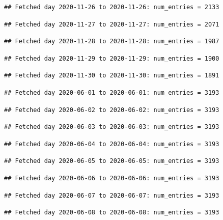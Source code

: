 \documentclass[]{article}
\begin{document}
\begin{verbatim}
## Fetched day 2020-11-26 to 2020-11-26: num_entries = 2133
\end{verbatim}

\begin{verbatim}
## Fetched day 2020-11-27 to 2020-11-27: num_entries = 2071
\end{verbatim}

\begin{verbatim}
## Fetched day 2020-11-28 to 2020-11-28: num_entries = 1987
\end{verbatim}

\begin{verbatim}
## Fetched day 2020-11-29 to 2020-11-29: num_entries = 1900
\end{verbatim}

\begin{verbatim}
## Fetched day 2020-11-30 to 2020-11-30: num_entries = 1891
\end{verbatim}

\begin{verbatim}
## Fetched day 2020-06-01 to 2020-06-01: num_entries = 3193
\end{verbatim}

\begin{verbatim}
## Fetched day 2020-06-02 to 2020-06-02: num_entries = 3193
\end{verbatim}

\begin{verbatim}
## Fetched day 2020-06-03 to 2020-06-03: num_entries = 3193
\end{verbatim}

\begin{verbatim}
## Fetched day 2020-06-04 to 2020-06-04: num_entries = 3193
\end{verbatim}

\begin{verbatim}
## Fetched day 2020-06-05 to 2020-06-05: num_entries = 3193
\end{verbatim}

\begin{verbatim}
## Fetched day 2020-06-06 to 2020-06-06: num_entries = 3193
\end{verbatim}

\begin{verbatim}
## Fetched day 2020-06-07 to 2020-06-07: num_entries = 3193
\end{verbatim}

\begin{verbatim}
## Fetched day 2020-06-08 to 2020-06-08: num_entries = 3193
\end{verbatim}
\end{document}
